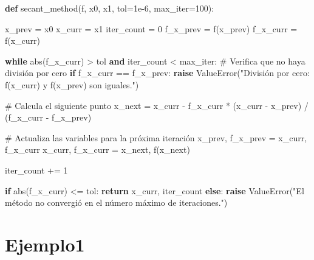 \documentclass[
  letterpaper,
  DIV=11,
  numbers=noendperiod]{scrartcl}
\newenvironment{Shaded}{\begin{snugshade}}{\end{snugshade}}
\newcommand{\BuiltInTok}[1]{\textcolor[rgb]{0.00,0.23,0.31}{#1}}
\newcommand{\CommentTok}[1]{\textcolor[rgb]{0.37,0.37,0.37}{#1}}
\newcommand{\ControlFlowTok}[1]{\textcolor[rgb]{0.00,0.23,0.31}{\textbf{#1}}}
\newcommand{\DecValTok}[1]{\textcolor[rgb]{0.68,0.00,0.00}{#1}}
\newcommand{\FloatTok}[1]{\textcolor[rgb]{0.68,0.00,0.00}{#1}}
\newcommand{\KeywordTok}[1]{\textcolor[rgb]{0.00,0.23,0.31}{\textbf{#1}}}
\newcommand{\NormalTok}[1]{\textcolor[rgb]{0.00,0.23,0.31}{#1}}
\newcommand{\OperatorTok}[1]{\textcolor[rgb]{0.37,0.37,0.37}{#1}}
\newcommand{\PreprocessorTok}[1]{\textcolor[rgb]{0.68,0.00,0.00}{#1}}
\newcommand{\StringTok}[1]{\textcolor[rgb]{0.13,0.47,0.30}{#1}}
\begin{document}
\begin{Shaded}
\begin{Highlighting}[]
\KeywordTok{def}\NormalTok{ secant\_method(f, x0, x1, tol}\OperatorTok{=}\FloatTok{1e{-}6}\NormalTok{, max\_iter}\OperatorTok{=}\DecValTok{100}\NormalTok{):}
  
\NormalTok{    x\_prev }\OperatorTok{=}\NormalTok{ x0}
\NormalTok{    x\_curr }\OperatorTok{=}\NormalTok{ x1}
\NormalTok{    iter\_count }\OperatorTok{=} \DecValTok{0}
\NormalTok{    f\_x\_prev }\OperatorTok{=}\NormalTok{ f(x\_prev)}
\NormalTok{    f\_x\_curr }\OperatorTok{=}\NormalTok{ f(x\_curr)}

    \ControlFlowTok{while} \BuiltInTok{abs}\NormalTok{(f\_x\_curr) }\OperatorTok{\textgreater{}}\NormalTok{ tol }\KeywordTok{and}\NormalTok{ iter\_count }\OperatorTok{\textless{}}\NormalTok{ max\_iter:}
        \CommentTok{\# Verifica que no haya división por cero}
        \ControlFlowTok{if}\NormalTok{ f\_x\_curr }\OperatorTok{==}\NormalTok{ f\_x\_prev:}
            \ControlFlowTok{raise} \PreprocessorTok{ValueError}\NormalTok{(}\StringTok{"División por cero: f(x\_curr) y f(x\_prev) son iguales."}\NormalTok{)}
        
        \CommentTok{\# Calcula el siguiente punto}
\NormalTok{        x\_next }\OperatorTok{=}\NormalTok{ x\_curr }\OperatorTok{{-}}\NormalTok{ f\_x\_curr }\OperatorTok{*}\NormalTok{ (x\_curr }\OperatorTok{{-}}\NormalTok{ x\_prev) }\OperatorTok{/}\NormalTok{ (f\_x\_curr }\OperatorTok{{-}}\NormalTok{ f\_x\_prev)}
        
        \CommentTok{\# Actualiza las variables para la próxima iteración}
\NormalTok{        x\_prev, f\_x\_prev }\OperatorTok{=}\NormalTok{ x\_curr, f\_x\_curr}
\NormalTok{        x\_curr, f\_x\_curr }\OperatorTok{=}\NormalTok{ x\_next, f(x\_next)}
        
\NormalTok{        iter\_count }\OperatorTok{+=} \DecValTok{1}

    \ControlFlowTok{if} \BuiltInTok{abs}\NormalTok{(f\_x\_curr) }\OperatorTok{\textless{}=}\NormalTok{ tol:}
        \ControlFlowTok{return}\NormalTok{ x\_curr, iter\_count}
    \ControlFlowTok{else}\NormalTok{:}
        \ControlFlowTok{raise} \PreprocessorTok{ValueError}\NormalTok{(}\StringTok{"El método no convergió en el número máximo de iteraciones."}\NormalTok{)}

\end{Highlighting}
\end{Shaded}

\section{Ejemplo1}\label{ejemplo1}
\end{document}
